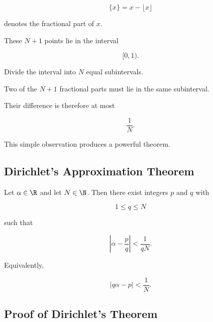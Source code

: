 \[ \{x\}=x-\lfloor x\rfloor \]

denotes the fractional part of \(x\).

These \(N+1\) points lie in the interval

\[ [0,1). \]

Divide the interval into \(N\) equal subintervals.

Two of the \(N+1\) fractional parts must lie in the same subinterval.

Their difference is therefore at most

\[ \frac1N. \]

This simple observation produces a powerful theorem.

\subsection{Dirichlet's Approximation Theorem}
\label{subsec:dirichlet-approximation-theorem}

\begin{theorem}
Let \(\alpha\in\R\) and let \(N\in\N\). Then there exist integers \(p\) and
\(q\) with

\[ 1\leq q\leq N \]

such that

\[ \boxed{\left|\alpha-\frac pq\right|<\frac1{qN}.} \]
\end{theorem}

Equivalently,

\[ \boxed{|q\alpha-p|<\frac1N.} \]

\subsection{Proof of Dirichlet's Theorem}
\label{subsec:proof-dirichlet-approximation}

